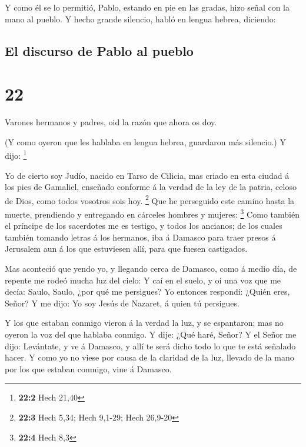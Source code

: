  Y como él se lo permitió, Pablo, estando en pie en las
gradas, hizo señal con la mano al pueblo. Y hecho grande silencio, habló
en lengua hebrea, diciendo:

\hypertarget{el-discurso-de-pablo-al-pueblo}{%
\subsection{El discurso de Pablo al
pueblo}\label{el-discurso-de-pablo-al-pueblo}}

\hypertarget{section-21}{%
\section{22}\label{section-21}}

 Varones hermanos y padres, oid la razón que ahora os doy.

 (Y como oyeron que les hablaba en lengua hebrea,
guardaron más silencio.) Y dijo: \footnote{\textbf{22:2} Hech 21,40}

 Yo de cierto soy Judío, nacido en Tarso de Cilicia, mas
criado en esta ciudad á los pies de Gamaliel, enseñado conforme á la
verdad de la ley de la patria, celoso de Dios, como todos vosotros sois
hoy. \footnote{\textbf{22:3} Hech 5,34; Hech 9,1-29; Hech 26,9-20}
 Que he perseguido este camino hasta la muerte, prendiendo
y entregando en cárceles hombres y mujeres: \footnote{\textbf{22:4} Hech
  8,3}  Como también el príncipe de los sacerdotes me es
testigo, y todos los ancianos; de los cuales también tomando letras á
los hermanos, iba á Damasco para traer presos á Jerusalem aun á los que
estuviesen allí, para que fuesen castigados.

 Mas aconteció que yendo yo, y llegando cerca de Damasco,
como á medio día, de repente me rodeó mucha luz del cielo:
 Y caí en el suelo, y oí una voz que me decía: Saulo,
Saulo, ¿por qué me persigues?  Yo entonces respondí:
¿Quién eres, Señor? Y me dijo: Yo soy Jesús de Nazaret, á quien tú
persigues.

 Y los que estaban conmigo vieron á la verdad la luz, y se
espantaron; mas no oyeron la voz del que hablaba conmigo.
 Y dije: ¿Qué haré, Señor? Y el Señor me dijo: Levántate,
y ve á Damasco, y allí te será dicho todo lo que te está señalado hacer.
 Y como yo no viese por causa de la claridad de la luz,
llevado de la mano por los que estaban conmigo, vine á Damasco.

